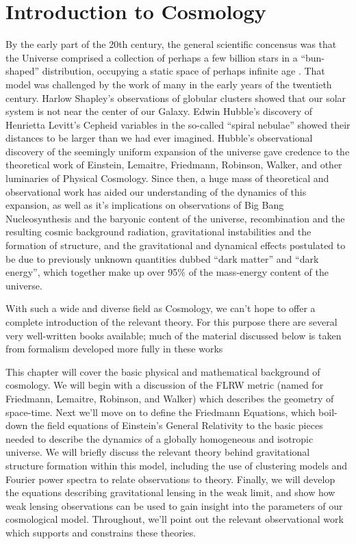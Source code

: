 \chapter{Introduction to Cosmology}

By the early part of the 20th century, the general scientific concensus
was that the Universe comprised a collection of perhaps a few billion
stars in a ``bun-shaped'' distribution, occupying a static space
of perhaps infinite age \citep{smith2009expanding}.
That model was challenged by the work of many in the early years of the
twentieth century.
Harlow Shapley's observations of globular clusters showed that our solar
system is not near the center of our Galaxy. Edwin Hubble's discovery of
Henrietta Levitt's Cepheid variables in the so-called ``spiral nebulae''
showed their distances to be larger than we had ever imagined.  Hubble's
observational discovery of the seemingly uniform expansion of the
universe gave credence to the theoretical work of Einstein, Lemaitre,
Friedmann, Robinson, Walker, and other luminaries of Physical Cosmology.
Since then, a huge mass of theoretical and observational work has aided
our understanding of the dynamics of this expansion, as
well as it's implications on observations of Big Bang Nucleosynthesis
and the baryonic content of the universe,
recombination and the resulting cosmic background radiation,
gravitational instabilities and the formation of structure,
and the gravitational and dynamical effects postulated to be due to
previously unknown quantities dubbed
``dark matter'' and ``dark energy'', which together
make up over 95\% of the mass-energy content of the universe.

With such a wide and diverse field as Cosmology, we can't hope to offer
a complete introduction of the relevant theory.  For this purpose there
are several very well-written books available; much of the material
discussed below is taken from formalism developed more fully in these works
\citep[see, e.g.][]{ryden2003cosmology, peebles1993principles, peacock1999cosmological}

This chapter will cover the basic physical and mathematical background of
cosmology.  We will begin with a discussion of the
FLRW metric (named for Friedmann, Lemaitre,
Robinson, and Walker) which describes the geometry of space-time.
Next we'll move on to define the Friedmann Equations, which boil-down
the field equations of Einstein's General Relativity to the basic pieces
needed to describe the dynamics of a globally homogeneous and isotropic
universe.  We will briefly discuss the relevant theory behind gravitational
structure formation within this model, including the use of clustering
models and Fourier power spectra to relate observations to theory.
Finally, we will develop the equations describing gravitational lensing
in the weak limit, and show how weak lensing observations can be used
to gain insight into the parameters of our cosmological model.
Throughout, we'll point out the relevant observational work which supports
and constrains these theories.

